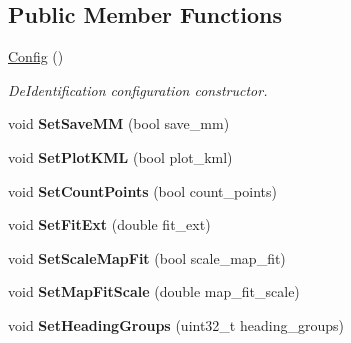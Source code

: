 \subsection*{Public Member Functions}
\begin{DoxyCompactItemize}
\item 
\hyperlink{classconfig_1_1Config_a406fd596b8db4ee66e2e431b29beb7a4}{Config} ()\hypertarget{classconfig_1_1Config_a406fd596b8db4ee66e2e431b29beb7a4}{}\label{classconfig_1_1Config_a406fd596b8db4ee66e2e431b29beb7a4}

\begin{DoxyCompactList}\small\item\em De\+Identification configuration constructor. \end{DoxyCompactList}\item 
void {\bfseries Set\+Save\+MM} (bool save\+\_\+mm)\hypertarget{classconfig_1_1Config_ab2523c23fc243061edfba4f46cd5e108}{}\label{classconfig_1_1Config_ab2523c23fc243061edfba4f46cd5e108}

\item 
void {\bfseries Set\+Plot\+K\+ML} (bool plot\+\_\+kml)\hypertarget{classconfig_1_1Config_ae47841b3de92d932841c7cca6b34bf63}{}\label{classconfig_1_1Config_ae47841b3de92d932841c7cca6b34bf63}

\item 
void {\bfseries Set\+Count\+Points} (bool count\+\_\+points)\hypertarget{classconfig_1_1Config_a5815dfc5e8859de1bdb912769748201d}{}\label{classconfig_1_1Config_a5815dfc5e8859de1bdb912769748201d}

\item 
void {\bfseries Set\+Fit\+Ext} (double fit\+\_\+ext)\hypertarget{classconfig_1_1Config_a8f9faade84c4e062abf47fd3f5be9aac}{}\label{classconfig_1_1Config_a8f9faade84c4e062abf47fd3f5be9aac}

\item 
void {\bfseries Set\+Scale\+Map\+Fit} (bool scale\+\_\+map\+\_\+fit)\hypertarget{classconfig_1_1Config_aa989c19444e6e28db0dad78d3278ea70}{}\label{classconfig_1_1Config_aa989c19444e6e28db0dad78d3278ea70}

\item 
void {\bfseries Set\+Map\+Fit\+Scale} (double map\+\_\+fit\+\_\+scale)\hypertarget{classconfig_1_1Config_ab11bc99253b6533974abc1e97a88886a}{}\label{classconfig_1_1Config_ab11bc99253b6533974abc1e97a88886a}

\item 
void {\bfseries Set\+Heading\+Groups} (uint32\+\_\+t heading\+\_\+groups)\hypertarget{classconfig_1_1Config_a91295f64cf04ffd2cc0f2b3e98d9b0ab}{}\label{classconfig_1_1Config_a91295f64cf04ffd2cc0f2b3e98d9b0ab}


\end{DoxyCompactItemize}
